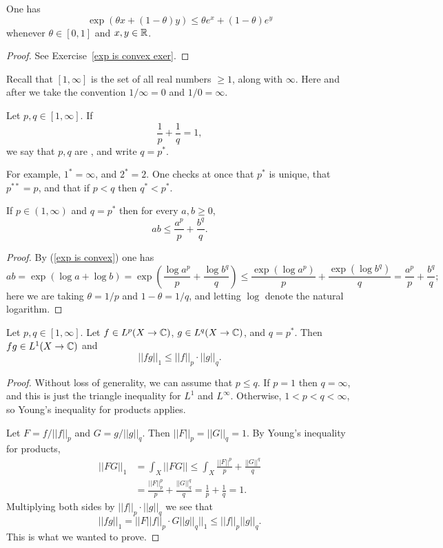 \begin{lemma}
One has
\begin{equation}\label{exp is convex}
\exp(\theta x + (1 - \theta)y) \leq \theta e^{x} + (1 - \theta)e^y
\end{equation}
whenever $\theta \in [0, 1]$ and $x, y \in \mathbb{R}$.
\end{lemma}
\begin{proof}
See Exercise~\ref{exp is convex exer}.
\end{proof}

Recall that $[1, \infty]$ is the set of all real numbers $\geq 1$, along with $\infty$.
Here and after we take the convention $1/\infty = 0$ and $1/0 = \infty$.

\begin{definition}
Let $p, q \in [1, \infty]$. If
\[\frac{1}{p} + \frac{1}{q} = 1,\]
we say that $p, q$ are , and write $q = p^*$.
\end{definition}

For example, $1^* = \infty$, and $2^* = 2$. One checks at once that $p^*$ is unique, that $p^{**} = p$, and that if $p < q$ then $q^* < p^*$.

\begin{theorem}
If $p \in (1, \infty)$ and $q = p^*$ then for every $a,b \geq 0$,
\[ab \leq \frac{a^p}{p} + \frac{b^q}{q}.\]
\end{theorem}
\begin{proof}
By (\ref{exp is convex}) one has
\[ab = \exp(\log a + \log b) = \exp\left(\frac{\log a^p}{p} + \frac{\log b^q}{q}\right) \leq \frac{\exp(\log a^p)}{p} + \frac{\exp(\log b^q)}{q} = \frac{a^p}{p} + \frac{b^q}{q};\]
here we are taking $\theta = 1/p$ and $1 - \theta = 1/q$, and letting $\log$ denote the natural logarithm.
\end{proof}

\begin{theorem}
Let $p, q \in [1, \infty]$.
Let $f \in L^p(X \to \mathbb{C})$, $g \in L^q(X \to \mathbb{C})$, and $q = p^*$.
Then $fg \in L^1(X \to \mathbb{C})$ and
\begin{equation}\label{Holder inequality}
||fg||_1 \leq ||f||_{p}  \cdot ||g||_q.
\end{equation}
\end{theorem}
\begin{proof}
Without loss of generality, we can assume that $p \leq q$.
If $p = 1$ then $q = \infty$, and this is just the triangle inequality for $L^1$ and $L^\infty$.
Otherwise, $1 < p < q < \infty$, so Young's inequality for products applies.

Let $F = f/||f||_{p} $ and $G = g/||g||_q$. Then $||F||_{p}  = ||G||_{q} = 1$.
By Young's inequality for products,
\begin{align*}||FG||_1 &= \int_{X} ||FG|| \leq \int_{X} \frac{||F||^p}{p} + \frac{||G||^q}{q}\\
&= \frac{||F||_{p} ^p}{p} + \frac{||G||_q^q}{q} = \frac{1}{p} + \frac{1}{q}  = 1.
\end{align*}
Multiplying both sides by $||f||_{p}  \cdot ||g||_q$ we see that
\[||fg||_1 = ||F||f||_{p}  \cdot G||g||_q||_1 \leq ||f||_{p}  ||g||_q.\]
This is what we wanted to prove.
\end{proof}

